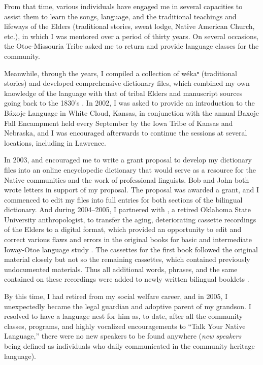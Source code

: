 \documentclass[output=paper]{LSP/langsci}
\begin{document}
From that time, various individuals have engaged me in several capacities to assist them to learn the songs, language, and the traditional teachings and lifeways of the Elders (traditional stories, sweat lodge, Native American Church, etc.), in which I was mentored over a period of thirty years. On several occasions, the Otoe-Missouria Tribe asked me to return and provide language classes for the community.  

Meanwhile, through the years, I compiled a collection of wékaⁿ (traditional stories) and developed comprehensive dictionary files, which combined my own knowledge of the language with that of tribal Elders and manuscript sources going back to the 1830's \citep{Goodtracks1992}. In 2002, I was asked to provide an introduction to the Báxoje Language in White Cloud, Kansas, in conjunction with the annual Baxoje Fall Encampment held every September by the Iowa Tribe of Kansas and Nebraska, and I was encouraged afterwards to continue the sessions at several locations, including in Lawrence. 

In 2003,  and  encouraged me to write a grant proposal to develop my dictionary files into an online encyclopedic dictionary that would serve as a resource for the Native communities and the work of professional linguists. Bob and John both wrote letters in support of my proposal. The proposal was awarded a grant, and I commenced to edit my files into full entries for both sections of the bilingual dictionary. And during 2004--2005, I partnered with , a retired Oklahoma State University anthropologist, to transfer the aging, deteriorating cassette recordings of the Elders to a digital format, which provided an opportunity to edit and correct various flaws and errors in the original books for basic and intermediate Ioway-Otoe language study \citep{OtoeIowaWistrandRobinson1977, OtoeIowaWistrandRobinson1978}. The cassettes for the first book followed the original material closely but not so the remaining cassettes, which contained previously undocumented materials. Thus all additional words, phrases, and the same contained on these recordings were added to newly written bilingual booklets \citep{Goodtracks2004a, Goodtracks2004b}.

By this time, I had retired from my social welfare career, and in 2005, I unexpectedly became the legal guardian and adoptive parent of my grandson. I resolved to have a language nest for him as, to date, after all the community classes, programs, and highly vocalized encouragements to ``Talk Your Native Language,'' there were no new speakers to be found anywhere (\emph{new speakers} being defined as individuals who daily communicated in the community heritage language).  
\end{document}
